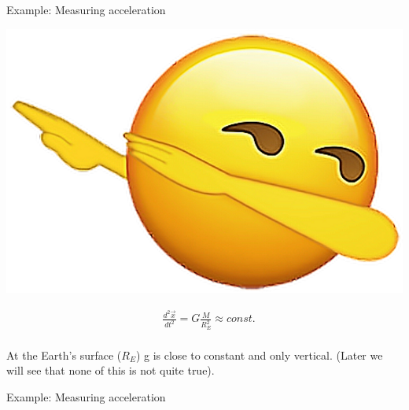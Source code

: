 \begin{frame}
\begin{PointSix}{Example: Measuring acceleration}
  \begin{minipage}[t]{0.3\textwidth}
    \includegraphics[width=\textwidth]{Figures/General/IcandothisSmiley_Kindpng.png}
    \end{minipage}\begin{minipage}[]{0.7\textwidth}
  \centering
  \begin{align*}
  &\frac{d^2\vec{x}}{dt^2} = G\frac{M}{R_E^2} \approx const. \\
  \end{align*}
\end{minipage}
  At the Earth's surface ($R_E$) g is close to constant and only vertical. (Later we will see that none of this is not quite true).

\end{PointSix}
\end{frame}

\begin{frame}
  \begin{PointSix}{Example: Measuring acceleration}
  \end{PointSix}
\end{frame}

